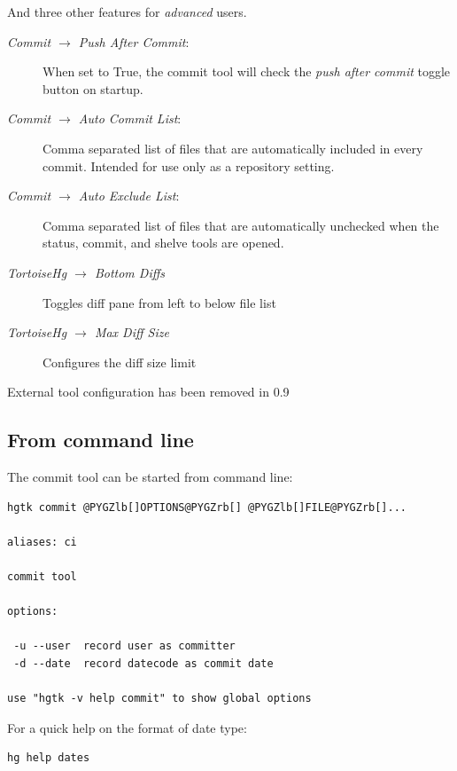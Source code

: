 \documentclass[letterpaper,10pt,english]{manual}
\begin{document}
And three other features for \emph{advanced} users.
\begin{description}
\item[\emph{Commit \(\rightarrow\) Push After Commit}:]
When set to True, the commit tool will check the \emph{push after
commit} toggle button on startup.

\item[\emph{Commit \(\rightarrow\) Auto Commit List}:]
Comma separated list of files that are automatically included in
every commit.  Intended for use only as a repository setting.

\item[\emph{Commit \(\rightarrow\) Auto Exclude List}:]
Comma separated list of files that are automatically unchecked
when the status, commit, and shelve tools are opened.

\item[\emph{TortoiseHg \(\rightarrow\) Bottom Diffs}]
Toggles diff pane from left to below file list

\item[\emph{TortoiseHg \(\rightarrow\) Max Diff Size}]
Configures the diff size limit

\end{description}

External tool configuration has been removed in 0.9


\subsection{From command line}

The commit tool can be started from command line:

\begin{Verbatim}[commandchars=@\[\]]
hgtk commit @PYGZlb[]OPTIONS@PYGZrb[] @PYGZlb[]FILE@PYGZrb[]...

aliases: ci

commit tool

options:

 -u --user  record user as committer
 -d --date  record datecode as commit date

use "hgtk -v help commit" to show global options
\end{Verbatim}

For a quick help on the format of date type:

\begin{Verbatim}[commandchars=@\[\]]
hg help dates
\end{Verbatim}
\end{document}
